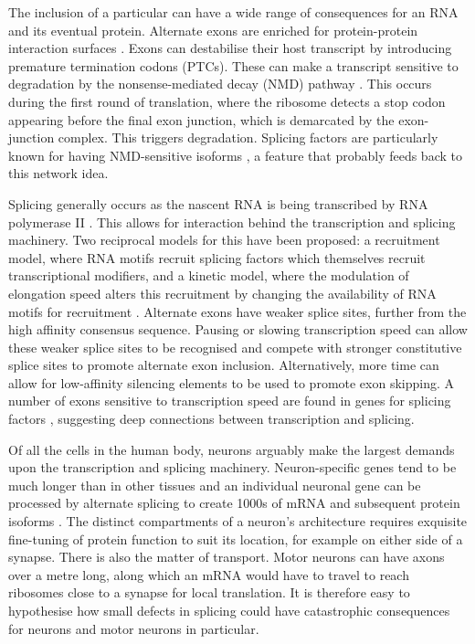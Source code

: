 The inclusion of a particular can have a wide range of consequences for an RNA and its eventual protein. 
Alternate exons are enriched for protein-protein interaction surfaces \citep{Ellis2012}. 
Exons can destabilise their host transcript by introducing premature termination codons (PTCs). 
These can make a transcript sensitive to degradation by the nonsense-mediated decay (NMD) pathway \citep{McGlincy2008-wh}. 
This occurs during the first round of translation, where the ribosome detects a stop codon appearing before the final exon junction, which is demarcated by the exon-junction complex.
This triggers degradation.  %
Splicing factors are particularly known for having NMD-sensitive isoforms \citep{Ni2007}, a feature that probably feeds back to this network idea. %

Splicing generally occurs as the nascent RNA is being transcribed by RNA polymerase II \citep{Beyer1988,Ameur2011}.
This allows for interaction behind the transcription and splicing machinery.
Two reciprocal models for this have been proposed: a recruitment model, where RNA motifs recruit splicing factors which themselves recruit transcriptional modifiers, and a kinetic model, where the modulation of elongation speed alters this recruitment by changing the availability of RNA motifs for recruitment \citep{Kornblihtt2004a}.
Alternate exons have weaker splice sites, further from the high affinity consensus sequence. %
Pausing or slowing transcription speed can allow these weaker splice sites to be recognised and compete with stronger constitutive splice sites to promote alternate exon inclusion.
Alternatively, more time can allow for low-affinity silencing elements to be used to promote exon skipping.
A number of exons sensitive to transcription speed are found in genes for splicing factors \citep{Ip2011}, suggesting deep connections between transcription and splicing. 

Of all the cells in the human body, neurons arguably make the largest demands upon the transcription and splicing machinery. Neuron-specific genes tend to be much longer than in other tissues \citep{Sibley2015} and an individual neuronal gene can be processed by alternate splicing to create 1000s of mRNA and subsequent protein isoforms \citep{Treutlein2014}. 
The distinct compartments of a neuron's architecture requires exquisite fine-tuning of protein function to suit its location, for example on either side of a synapse. 
There is also the matter of transport. 
Motor neurons can have axons over a metre long, along which an mRNA would have to travel to reach ribosomes close to a synapse for local translation. 
It is therefore easy to hypothesise how small defects in splicing could have catastrophic consequences for neurons and motor neurons in particular. 

